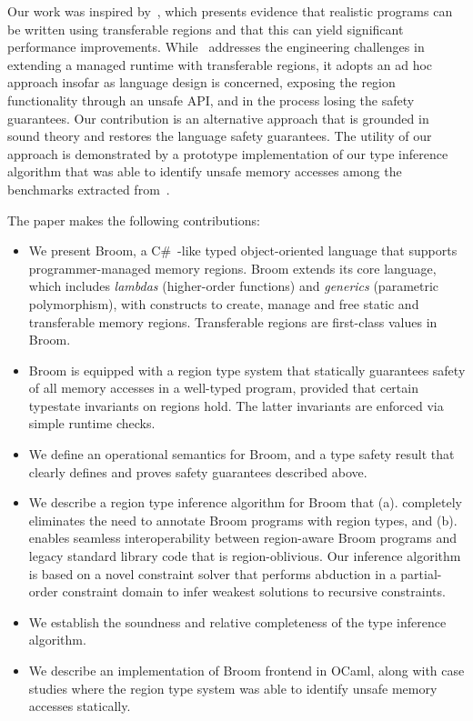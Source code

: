 \documentclass[a4paper,UKenglish]{lipics-v2018}
\newcommand{\broom}{{\sc Broom}\xspace}
\newcommand{\csharp}{C\#~}
\begin{document}
Our work was inspired by~\cite{Broom:HotOS}, which presents evidence
that realistic programs can be written using transferable regions and
that this can yield significant performance improvements.
While~\cite{Broom:HotOS} addresses the engineering challenges in
extending a managed runtime with transferable regions, it adopts an ad
hoc approach insofar as language design is concerned, exposing the
region functionality through an unsafe API, and in the process losing
the safety guarantees. Our contribution is an alternative approach
that is grounded in sound theory and restores the language safety
guarantees. The utility of our approach is demonstrated by a prototype
implementation of our type inference algorithm that was able to
identify unsafe memory accesses among the benchmarks extracted
from~\cite{Broom:HotOS}.  

The paper makes the following contributions:

\begin{itemize} 
  \item We present \broom, a \csharp-like typed object-oriented
  language that supports programmer-managed memory regions. \broom{}
  extends its core language, which includes \emph{lambdas}
  (higher-order functions) and \emph{generics} (parametric
  polymorphism), with constructs to create, manage and free static and
  transferable memory regions. Transferable regions are first-class
  values in \broom.

\item \broom{} is equipped with a region type system that statically
  guarantees safety of all memory accesses in a well-typed program,
  provided that certain typestate invariants on regions hold.  The
  latter invariants are enforced via simple runtime checks.

  \item We define an operational semantics for \broom, and a type
  safety result that clearly defines and proves safety guarantees
  described above.

  \item We describe a region type inference algorithm for \broom that
  (a). completely eliminates the need to annotate \broom programs with
  region types, and (b). enables seamless interoperability between
  region-aware \broom programs and legacy standard library code that
  is region-oblivious. Our inference algorithm is based on a novel
  constraint solver that performs abduction in a partial-order
  constraint domain to infer weakest solutions to recursive
  constraints.

\item We establish the soundness and relative completeness of the type
inference algorithm.

  \item We describe an implementation of \broom frontend in OCaml,
  along with case studies where the region type system was able to
  identify unsafe memory accesses statically.
  
\end{itemize}
\end{document}
